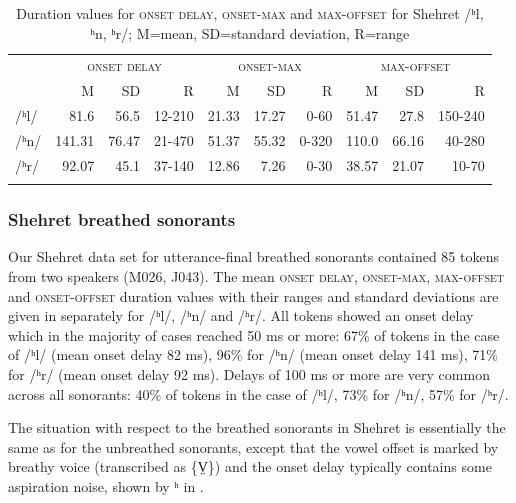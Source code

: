 \documentclass[output=paper]{langscibook}
\begin{document}
\begin{table}[p]
\caption{Duration values for \textsc{onset delay}, \textsc{onset-max} and \textsc{max-offset} for Shehret /ʰl, ʰn, ʰr/; M=mean, SD=standard deviation, R=range}
\label{tab:watson:9}

\begin{tabularx}{\textwidth}{l@{~}rrrrrrrrr}
\lsptoprule
 & \multicolumn{3}{c}{\textsc{onset} \textsc{delay}} & \multicolumn{3}{c}{\textsc{onset-max}} & \multicolumn{3}{c}{\textsc{max-offset}}\\
 \cmidrule(lr){2-4}\cmidrule(lr){5-7}\cmidrule(lr){8-10}
& M & SD & R & M & SD & R & M & SD & R\\
\midrule
/ʰl/ & 81.6 & 56.5 & 12-210 & 21.33 & 17.27 & 0-60 & 51.47 & 27.8 & 150-240\\
/ʰn/ & 141.31 & 76.47 & 21-470 & 51.37 & 55.32 & 0-320 & 110.0 & 66.16 & 40-280\\
/ʰr/ & 92.07 & 45.1 & 37-140 & 12.86 & 7.26 & 0-30 & 38.57 & 21.07 & 10-70\\
\lspbottomrule
\end{tabularx}
\end{table}

\subsubsection{Shehret breathed sonorants} %
\label{sec:watson:4.3.4}
\largerpage
Our Shehret data set for utterance-final breathed sonorants contained 85 tokens from two speakers (M026, J043). The mean \textsc{onset} \textsc{delay}, \textsc{onset-max}, \textsc{max-off\-set} and \textsc{onset-offset} duration values with their ranges and standard deviations are given in  separately for \mbox{/ʰl/}, \mbox{/ʰn/} and \mbox{/ʰr/}. All tokens showed an onset delay which in the majority of cases reached 50 ms or more: 67\% of tokens in the case of \mbox{/ʰl/} (mean onset delay 82 ms), 96\% for \mbox{/ʰn/} (mean onset delay 141 ms), 71\% for \mbox{/ʰr/} (mean onset delay 92 ms). Delays of 100 ms or more are very common across all sonorants: 40\% of tokens in the case of \mbox{/ʰl/}, 73\% for \mbox{/ʰn/}, 57\% for \mbox{/ʰr/}.



The situation with respect to the breathed sonorants in Shehret is essentially the same as for the unbreathed sonorants, except that the vowel offset is marked by breathy voice (transcribed as \{V̤\}) and the onset delay typically contains some aspiration noise, shown by ʰ in .
\end{document}

